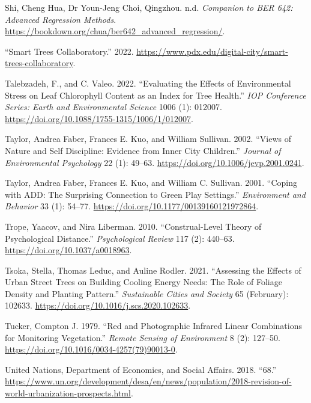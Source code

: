 \documentclass[12pt,twoside]{reedthesis}
\newlength{\cslhangindent}
\newenvironment{CSLReferences}[2] %
 {%
  \setlength{\parindent}{0pt}
  \ifodd #1 \everypar{\setlength{\hangindent}{\cslhangindent}}\ignorespaces\fi
  \ifnum #2 > 0
  \setlength{\parskip}{#2\baselineskip}
  \fi
 }%
 {}
\begin{document}
\begin{CSLReferences}{1}{0}
\leavevmode{}%
Shi, Cheng Hua, Dr Youn-Jeng Choi, Qingzhou. n.d. \emph{Companion to BER 642: Advanced Regression Methods}. \url{https://bookdown.org/chua/ber642_advanced_regression/}.

\leavevmode{}%
{``Smart Trees Collaboratory.''} 2022. \url{https://www.pdx.edu/digital-city/smart-trees-collaboratory}.

\leavevmode{}%
Talebzadeh, F., and C. Valeo. 2022. {``Evaluating the Effects of Environmental Stress on Leaf Chlorophyll Content as an Index for Tree Health.''} \emph{IOP Conference Series: Earth and Environmental Science} 1006 (1): 012007. \url{https://doi.org/10.1088/1755-1315/1006/1/012007}.

\leavevmode{}%
Taylor, Andrea Faber, Frances E. Kuo, and William Sullivan. 2002. {``Views of Nature and Self Discipline: Evidence from Inner City Children.''} \emph{Journal of Environmental Psychology} 22 (1): 49--63. \url{https://doi.org/10.1006/jevp.2001.0241}.

\leavevmode{}%
Taylor, Andrea Faber, Frances E. Kuo, and William C. Sullivan. 2001. {``Coping with ADD: The Surprising Connection to Green Play Settings.''} \emph{Environment and Behavior} 33 (1): 54--77. \url{https://doi.org/10.1177/00139160121972864}.

\leavevmode{}%
Trope, Yaacov, and Nira Liberman. 2010. {``Construal-Level Theory of Psychological Distance.''} \emph{Psychological Review} 117 (2): 440--63. \url{https://doi.org/10.1037/a0018963}.

\leavevmode{}%
Tsoka, Stella, Thomas Leduc, and Auline Rodler. 2021. {``Assessing the Effects of Urban Street Trees on Building Cooling Energy Needs: The Role of Foliage Density and Planting Pattern.''} \emph{Sustainable Cities and Society} 65 (February): 102633. \url{https://doi.org/10.1016/j.scs.2020.102633}.

\leavevmode{}%
Tucker, Compton J. 1979. {``Red and Photographic Infrared Linear Combinations for Monitoring Vegetation.''} \emph{Remote Sensing of Environment} 8 (2): 127--50. \url{https://doi.org/10.1016/0034-4257(79)90013-0}.

\leavevmode{}%
United Nations, Department of Economics, and Social Affairs. 2018. {``68.''} \url{https://www.un.org/development/desa/en/news/population/2018-revision-of-world-urbanization-prospects.html}.


\end{CSLReferences}
\end{document}
